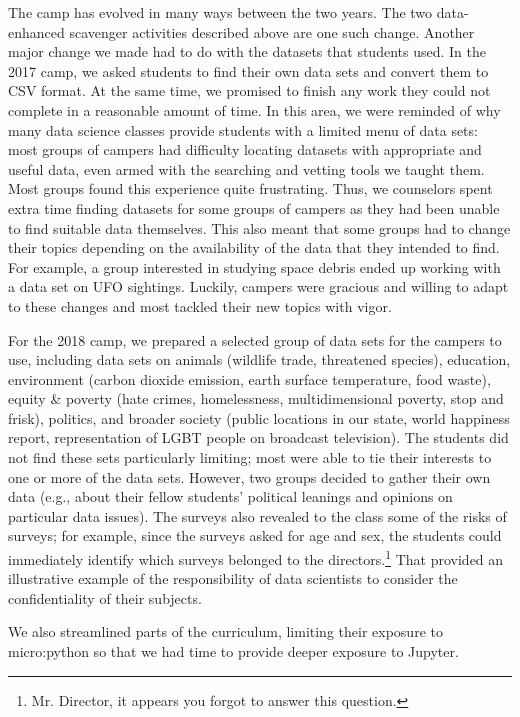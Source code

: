 The camp has evolved in many ways between the two years.  The two
data-enhanced scavenger activities described above are one such
change.
Another major change we made had to do with the datasets that
students used.  In the 2017 camp, we asked students to find their
own data sets and convert them to CSV format.  At the same time,
we promised to finish any work they could not complete in a reasonable
amount of time.  In this area, we were reminded of why many data
science classes provide students with a limited menu of data sets:
most groups of campers had difficulty locating datasets with
appropriate and useful data, even armed with the searching and
vetting tools we taught them.  Most groups found this experience
quite frustrating.  Thus, we counselors spent extra time finding
datasets for some groups of campers as they had been unable to find
suitable data themselves.  This also meant that some groups had to
change their topics depending on the availability of the data that
they intended to find.  For example, a group interested in studying
space debris ended up working with a data set on UFO sightings.
Luckily, campers were gracious and willing to adapt to these changes
and most tackled their new topics with vigor.

For the 2018 camp, we prepared a selected group of data sets for
the campers to use, including data sets on animals (wildlife trade,
threatened species), education, environment (carbon dioxide emission,
earth surface temperature, food waste), equity \& poverty (hate crimes,
homelessness, multidimensional poverty, stop and frisk), politics,
and broader society (public locations in our state, world happiness
report, representation of LGBT people on broadcast television).
The students did not find these sets particularly limiting; most
were able to tie their interests to one or more of the data sets.
However, two groups decided to gather their own data (e.g., about
their fellow students' political leanings and opinions on particular
data issues).  The surveys also revealed to the class some of the
risks of surveys; for example, since the surveys asked for age and
sex, the students could immediately identify which surveys belonged
to the directors.\footnote{Mr. Director, it appears you forgot to
answer this question.}  That provided an illustrative example of
the responsibility of data scientists to consider the confidentiality
of their subjects.

We also streamlined parts of the curriculum, limiting their exposure
to micro:python so that we had time to provide deeper exposure to Jupyter.


